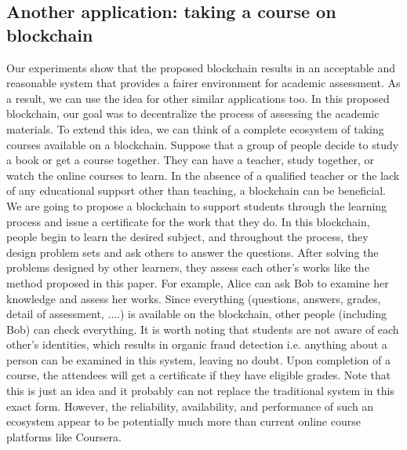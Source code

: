 \documentclass[manuscript,review,anonymous]{acmart}%
\begin{document}
 \subsection{Another application: taking a course on blockchain}
 
 Our experiments show that the proposed blockchain results in an acceptable and reasonable system that provides a fairer environment for academic assessment.
 As a result, we can use the idea for other similar applications too. In this proposed blockchain, our goal was to decentralize the process of assessing the academic materials.
 To extend this idea, we can think of a complete ecosystem of taking courses available on a blockchain.
 Suppose that a group of people decide to study a book or get a course together. They can have a teacher, study together, or watch the online courses to learn.
 In the absence of a qualified teacher or the lack of any educational support other than teaching, a blockchain can be beneficial. 
 We are going to propose a blockchain to support students through the learning process and issue a certificate for the work that they do.
 In this blockchain, people begin to learn the desired subject, and throughout the process, they design problem sets and ask others to answer the questions.
 After solving the problems designed by other learners, they assess each other's works like the method proposed in this paper.
 For example, Alice can ask Bob to examine her knowledge and assess her works. 
 Since everything (questions, answers, grades, detail of assessment, $\dots$.) is available on the blockchain, other people (including Bob) can check everything.
 It is worth noting that students are not aware of each other's identities, which results in organic fraud detection i.e. anything about a person can be examined in this system, leaving no doubt.
 Upon completion of a course, the attendees will get a certificate if they have eligible grades. Note that this is just an idea and it probably can not replace the traditional system in this exact form.
 However, the reliability, availability, and performance of such an ecosystem appear to be potentially much more than current online course platforms like Coursera.



\end{document}
